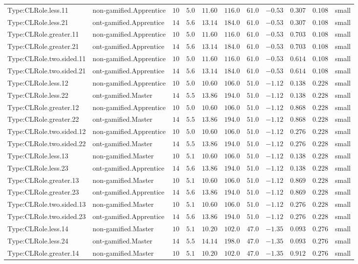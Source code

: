 \documentclass[6pt,a4paper]{article}
\begin{document}
{\begin{longtable}{llrrrrrrrrl}
Type:CLRole.less.11&non-gamified.Apprentice&$10$&$5.0$&$11.60$&$116.0$&$ 61.0$&$-0.53$&$0.307$&$0.108$&small\tabularnewline
Type:CLRole.less.21&ont-gamified.Apprentice&$14$&$5.6$&$13.14$&$184.0$&$ 61.0$&$-0.53$&$0.307$&$0.108$&small\tabularnewline
Type:CLRole.greater.11&non-gamified.Apprentice&$10$&$5.0$&$11.60$&$116.0$&$ 61.0$&$-0.53$&$0.703$&$0.108$&small\tabularnewline
Type:CLRole.greater.21&ont-gamified.Apprentice&$14$&$5.6$&$13.14$&$184.0$&$ 61.0$&$-0.53$&$0.703$&$0.108$&small\tabularnewline
Type:CLRole.two.sided.11&non-gamified.Apprentice&$10$&$5.0$&$11.60$&$116.0$&$ 61.0$&$-0.53$&$0.614$&$0.108$&small\tabularnewline
Type:CLRole.two.sided.21&ont-gamified.Apprentice&$14$&$5.6$&$13.14$&$184.0$&$ 61.0$&$-0.53$&$0.614$&$0.108$&small\tabularnewline
Type:CLRole.less.12&non-gamified.Apprentice&$10$&$5.0$&$10.60$&$106.0$&$ 51.0$&$-1.12$&$0.138$&$0.228$&small\tabularnewline
Type:CLRole.less.22&ont-gamified.Master&$14$&$5.5$&$13.86$&$194.0$&$ 51.0$&$-1.12$&$0.138$&$0.228$&small\tabularnewline
Type:CLRole.greater.12&non-gamified.Apprentice&$10$&$5.0$&$10.60$&$106.0$&$ 51.0$&$-1.12$&$0.868$&$0.228$&small\tabularnewline
Type:CLRole.greater.22&ont-gamified.Master&$14$&$5.5$&$13.86$&$194.0$&$ 51.0$&$-1.12$&$0.868$&$0.228$&small\tabularnewline
Type:CLRole.two.sided.12&non-gamified.Apprentice&$10$&$5.0$&$10.60$&$106.0$&$ 51.0$&$-1.12$&$0.276$&$0.228$&small\tabularnewline
Type:CLRole.two.sided.22&ont-gamified.Master&$14$&$5.5$&$13.86$&$194.0$&$ 51.0$&$-1.12$&$0.276$&$0.228$&small\tabularnewline
Type:CLRole.less.13&non-gamified.Master&$10$&$5.1$&$10.60$&$106.0$&$ 51.0$&$-1.12$&$0.138$&$0.228$&small\tabularnewline
Type:CLRole.less.23&ont-gamified.Apprentice&$14$&$5.6$&$13.86$&$194.0$&$ 51.0$&$-1.12$&$0.138$&$0.228$&small\tabularnewline
Type:CLRole.greater.13&non-gamified.Master&$10$&$5.1$&$10.60$&$106.0$&$ 51.0$&$-1.12$&$0.869$&$0.228$&small\tabularnewline
Type:CLRole.greater.23&ont-gamified.Apprentice&$14$&$5.6$&$13.86$&$194.0$&$ 51.0$&$-1.12$&$0.869$&$0.228$&small\tabularnewline
Type:CLRole.two.sided.13&non-gamified.Master&$10$&$5.1$&$10.60$&$106.0$&$ 51.0$&$-1.12$&$0.276$&$0.228$&small\tabularnewline
Type:CLRole.two.sided.23&ont-gamified.Apprentice&$14$&$5.6$&$13.86$&$194.0$&$ 51.0$&$-1.12$&$0.276$&$0.228$&small\tabularnewline
Type:CLRole.less.14&non-gamified.Master&$10$&$5.1$&$10.20$&$102.0$&$ 47.0$&$-1.35$&$0.093$&$0.276$&small\tabularnewline
Type:CLRole.less.24&ont-gamified.Master&$14$&$5.5$&$14.14$&$198.0$&$ 47.0$&$-1.35$&$0.093$&$0.276$&small\tabularnewline
Type:CLRole.greater.14&non-gamified.Master&$10$&$5.1$&$10.20$&$102.0$&$ 47.0$&$-1.35$&$0.912$&$0.276$&small\tabularnewline

\end{longtable}}
\end{document}
